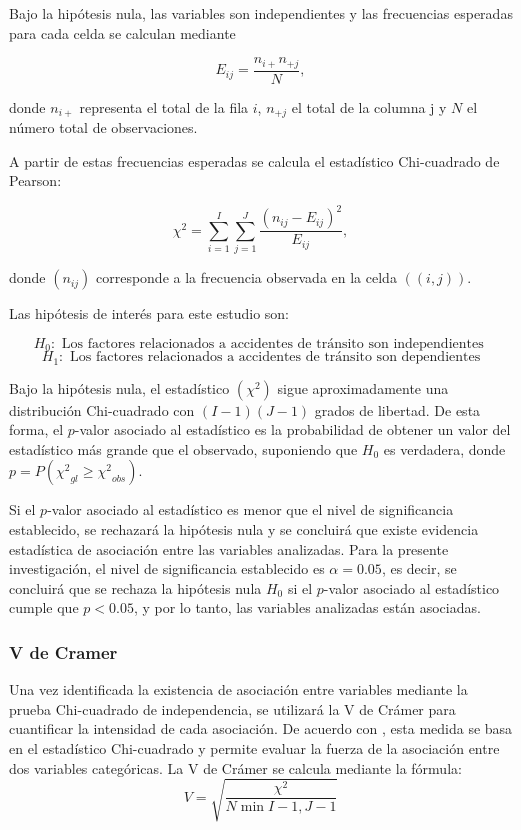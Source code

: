 \documentclass[12pt]{article}
\begin{document}
Bajo la hipótesis nula, las variables son independientes y las frecuencias esperadas para cada celda se calculan mediante

$$
E_{ij}=\frac{n_{i+}n_{+j}}{N},
$$

donde $n_{i+}$ representa el total de la fila $i$, $n_{+j}$ el total de la columna j y $N$ el número total de observaciones.

A partir de estas frecuencias esperadas se calcula el estadístico Chi-cuadrado de Pearson:

$$
\chi^2=\sum_{i=1}^{I}\sum_{j=1}^{J}
\frac{(n_{ij}-E_{ij})^2}{E_{ij}},
$$

donde $(n_{ij})$ corresponde a la frecuencia observada en la celda $((i,j))$.

Las hipótesis de interés para este estudio son:

$$ H_0: \text{ Los factores relacionados a accidentes de tránsito son independientes } $$
$$ H_1: \text{ Los factores relacionados a accidentes de tránsito son dependientes} $$

Bajo la hipótesis nula, el estadístico $(\chi^2)$ sigue aproximadamente una distribución Chi-cuadrado con
$(I-1)(J-1)$ grados de libertad. De esta forma, el $p$-valor asociado al estadístico es la probabilidad de obtener un valor del estadístico más grande
que el observado, suponiendo que $H_0$ es verdadera, donde $p=P({\chi^2}_{gl} \geq {\chi^2}_{obs})$.

Si el $p$-valor asociado al estadístico es menor que el nivel de significancia establecido, se rechazará la hipótesis nula y se concluirá que existe 
evidencia estadística de asociación entre las variables analizadas. Para la presente investigación, el nivel de significancia establecido es $\alpha = 0.05$, es decir,
se concluirá que se rechaza la hipótesis nula $H_0$ si el $p$-valor asociado al estadístico cumple que $p<0.05$, y por lo tanto, las variables analizadas están asociadas.


\subsubsection*{V de Cramer}
Una vez identificada la existencia de asociación entre variables mediante la prueba Chi-cuadrado
de independencia, se utilizará la V de Crámer para cuantificar la intensidad de cada asociación. De acuerdo con \textcite{McHugh2013},
esta medida se basa en el estadístico Chi-cuadrado y permite evaluar la fuerza de la asociación entre dos variables categóricas.
La V de Crámer se calcula mediante la fórmula:
$$
V = \sqrt{\frac{\chi^2}{N\min{I-1, J-1}}}
$$
\end{document}
